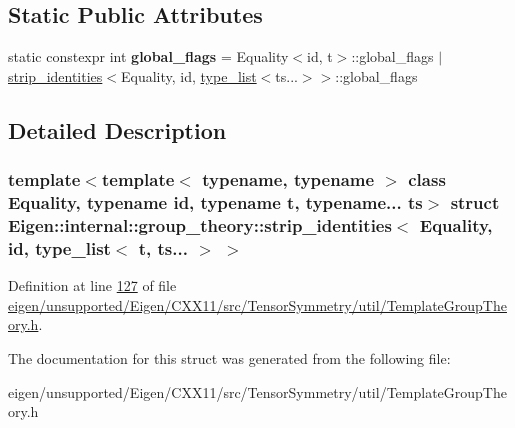 \subsection*{Static Public Attributes}
\begin{DoxyCompactItemize}
\item 
\mbox{\label{struct_eigen_1_1internal_1_1group__theory_1_1strip__identities_3_01_equality_00_01id_00_01type__f08cc45c8ea5d12fcc4f4eb6bf8771ff_ac51dcbd29d4405e7ad8fae7e45a58633}} 
static constexpr int {\bfseries global\+\_\+flags} = Equality$<$id, t$>$\+::global\+\_\+flags $\vert$ \hyperlink{struct_eigen_1_1internal_1_1group__theory_1_1strip__identities}{strip\+\_\+identities}$<$Equality, id, \hyperlink{struct_eigen_1_1internal_1_1type__list}{type\+\_\+list}$<$ts...$>$$>$\+::global\+\_\+flags
\end{DoxyCompactItemize}


\subsection{Detailed Description}
\subsubsection*{template$<$template$<$ typename, typename $>$ class Equality, typename id, typename t, typename... ts$>$\newline
struct Eigen\+::internal\+::group\+\_\+theory\+::strip\+\_\+identities$<$ Equality, id, type\+\_\+list$<$ t, ts... $>$ $>$}



Definition at line \hyperlink{eigen_2unsupported_2_eigen_2_c_x_x11_2src_2_tensor_symmetry_2util_2_template_group_theory_8h_source_l00127}{127} of file \hyperlink{eigen_2unsupported_2_eigen_2_c_x_x11_2src_2_tensor_symmetry_2util_2_template_group_theory_8h_source}{eigen/unsupported/\+Eigen/\+C\+X\+X11/src/\+Tensor\+Symmetry/util/\+Template\+Group\+Theory.\+h}.



The documentation for this struct was generated from the following file\+:\begin{DoxyCompactItemize}
\item 
eigen/unsupported/\+Eigen/\+C\+X\+X11/src/\+Tensor\+Symmetry/util/\+Template\+Group\+Theory.\+h\end{DoxyCompactItemize}

